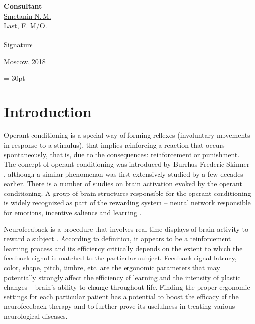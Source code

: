\documentclass[14pt,a4paper]{scrartcl}
\begin{document}
\begin{titlepage}
	\hfill\begin{minipage}{0.4\textwidth}
		\textbf{Consultant}\\[0.3cm]
		\underline{Smetanin N.\,M.} \\
		\scriptsize{Last, F. M/O.}\\\\
		\underline{\hspace{7cm}}
		\scriptsize{Signature}\\
			\end{minipage}

	    \vfill
	    \vfill
	    \vfill  

		\begin{center}
		\vfill
		  Moscow, 2018
		\end{center}
	\end{titlepage}


\newpage
\tableofcontents
\fancyhf{} 
\renewcommand{\headrulewidth}{0pt} 
\footskip = 30pt
\fancyfoot[R]{\thepage} 
\pagestyle{fancy}
\fancypagestyle{plain}{
  \fancyhf{}
  \renewcommand{\headrulewidth}{0pt}
  \fancyhf[lef,rof]{\thepage}
}

\newpage
\section{Introduction}
\label{sec:Introduction}

Operant conditioning is a special way of forming reflexes (involuntary movements in response to a stimulus), that implies reinforcing a reaction that occurs spontaneously, that is, due to the consequences: reinforcement or punishment. The concept of operant conditioning was introduced by Burrhus Frederic Skinner \cite{Skinner1971a,Skinner1971,Skinner1950,Jones1939}, although a similar phenomenon was first extensively studied by \cite{Thorndike1898} a few decades earlier. There is a number of studies on brain activation evoked by the operant conditioning. A group of brain structures responsible for the operant conditioning is widely recognized as part of the rewarding system – neural network responsible for emotions, incentive salience and learning \cite{Schultz2015}. 

Neurofeedback is a procedure that involves real-time displays of brain activity to reward a subject \cite{Kamiya2011}. According to definition, it appears to be a reinforcement learning process and its efficiency critically depends on the extent to which the feedback signal is matched to the particular subject. Feedback signal latency, color, shape, pitch, timbre, etc. are the ergonomic parameters that may potentially strongly affect the efficiency of learning and the intensity of plastic changes – brain’s ability to change throughout life. Finding the proper ergonomic settings for each particular patient has a potential to boost the efficacy of the neurofeedback therapy and to further prove its usefulness in treating various neurological diseases.
\newpage
\end{document}
